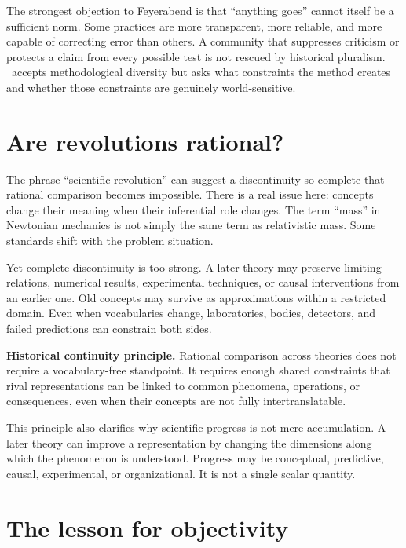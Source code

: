 The strongest objection to Feyerabend is that \enquote{anything goes} cannot
itself be a sufficient norm. Some practices are more transparent, more
reliable, and more capable of correcting error than others. A community that
suppresses criticism or protects a claim from every possible test is not
rescued by historical pluralism. \RCR\ accepts methodological diversity but
asks what constraints the method creates and whether those constraints are
genuinely world-sensitive.

\section{Are revolutions rational?}

The phrase \enquote{scientific revolution} can suggest a discontinuity so
complete that rational comparison becomes impossible. There is a real issue
here: concepts change their meaning when their inferential role changes. The
term \enquote{mass} in Newtonian mechanics is not simply the same term as
relativistic mass. Some standards shift with the problem situation.

Yet complete discontinuity is too strong. A later theory may preserve limiting
relations, numerical results, experimental techniques, or causal interventions
from an earlier one. Old concepts may survive as approximations within a
restricted domain. Even when vocabularies change, laboratories, bodies,
detectors, and failed predictions can constrain both sides.

\begin{principlebox}
\textbf{Historical continuity principle.} Rational comparison across theories
does not require a vocabulary-free standpoint. It requires enough shared
constraints that rival representations can be linked to common phenomena,
operations, or consequences, even when their concepts are not fully
intertranslatable.
\end{principlebox}

This principle also clarifies why scientific progress is not mere accumulation.
A later theory can improve a representation by changing the dimensions along
which the phenomenon is understood. Progress may be conceptual, predictive,
causal, experimental, or organizational. It is not a single scalar quantity.

\section{The lesson for objectivity}

